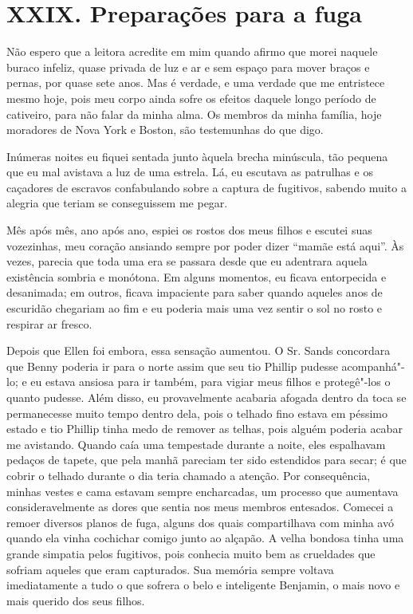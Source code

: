 \chapter{XXIX. Preparações para a
fuga}

Não espero que a leitora acredite em
mim quando afirmo que morei naquele buraco infeliz, quase privada de luz
e ar e sem espaço para mover braços e pernas, por quase sete anos. Mas é
verdade, e uma verdade que me entristece mesmo hoje, pois meu corpo
ainda sofre os efeitos daquele longo período de cativeiro, para não
falar da minha alma. Os membros da minha família, hoje moradores de Nova
York e Boston, são testemunhas do que digo.

Inúmeras noites eu fiquei sentada junto
àquela brecha minúscula, tão pequena que eu mal avistava a luz de uma
estrela. Lá, eu escutava as patrulhas e os caçadores de escravos
confabulando sobre a captura de fugitivos, sabendo muito a alegria que
teriam se conseguissem me pegar.

Mês após mês, ano após ano, espiei os
rostos dos meus filhos e escutei suas vozezinhas, meu coração ansiando
sempre por poder dizer ``mamãe está aqui''. Às vezes, parecia que toda
uma era se passara desde que eu adentrara aquela existência sombria e
monótona. Em alguns momentos, eu ficava entorpecida e desanimada; em
outros, ficava impaciente para saber quando aqueles anos de escuridão
chegariam ao fim e eu poderia mais uma vez sentir o sol no rosto e
respirar ar fresco.

Depois que Ellen foi embora, essa
sensação aumentou. O Sr. Sands concordara que Benny poderia ir para o
norte assim que seu tio Phillip pudesse acompanhá"-lo; e eu estava
ansiosa para ir também, para vigiar meus filhos e protegê"-los o quanto
pudesse. Além disso, eu provavelmente acabaria afogada dentro da toca se
permanecesse muito tempo dentro dela, pois o telhado fino estava em
péssimo estado e tio Phillip tinha medo de remover as telhas, pois
alguém poderia acabar me avistando. Quando caía uma tempestade durante a
noite, eles espalhavam pedaços de tapete, que pela manhã pareciam ter
sido estendidos para secar; é que cobrir o telhado durante o dia teria
chamado a atenção. Por consequência, minhas vestes e cama estavam sempre
encharcadas, um processo que aumentava consideravelmente as dores que
sentia nos meus membros entesados. Comecei a remoer diversos planos de
fuga, alguns dos quais compartilhava com minha avó quando ela vinha
cochichar comigo junto ao alçapão. A velha bondosa tinha uma grande
simpatia pelos fugitivos, pois conhecia muito bem as crueldades que
sofriam aqueles que eram capturados. Sua memória sempre voltava
imediatamente a tudo o que sofrera o belo e inteligente Benjamin, o mais
novo e mais querido dos seus filhos.

